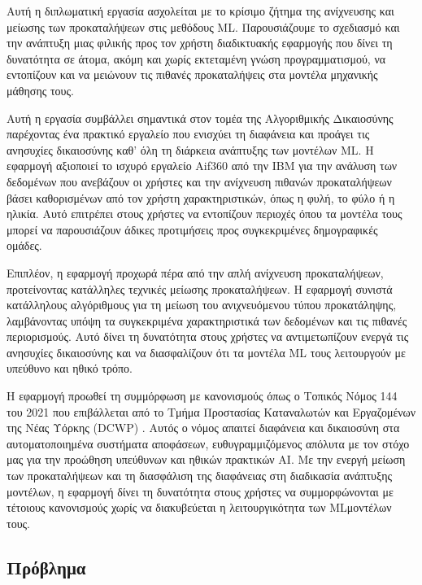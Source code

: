 \documentclass[12pt,twoside]{article}
\newcommand{\en}{\selectlanguage{english}}
\newcommand{\gr}{\selectlanguage{greek}}
\begin{document}
Αυτή η διπλωματική εργασία ασχολείται με το κρίσιμο ζήτημα της ανίχνευσης και μείωσης των προκαταλήψεων στις μεθόδους ML. Παρουσιάζουμε το σχεδιασμό και την ανάπτυξη μιας φιλικής προς τον χρήστη διαδικτυακής εφαρμογής που δίνει τη δυνατότητα σε άτομα, ακόμη και χωρίς εκτεταμένη γνώση προγραμματισμού, να εντοπίζουν και να μειώνουν τις πιθανές προκαταλήψεις στα μοντέλα μηχανικής μάθησης τους.

Αυτή η εργασία συμβάλλει σημαντικά στον τομέα της Αλγοριθμικής Δικαιοσύνης παρέχοντας ένα πρακτικό εργαλείο που ενισχύει τη διαφάνεια και προάγει τις ανησυχίες δικαιοσύνης καθ' όλη τη διάρκεια ανάπτυξης των μοντέλων ML. Η εφαρμογή αξιοποιεί το ισχυρό εργαλείο Aif360 από την IBM \cite{IBM2023} για την ανάλυση των δεδομένων που ανεβάζουν οι χρήστες και την ανίχνευση πιθανών προκαταλήψεων βάσει καθορισμένων από τον χρήστη χαρακτηριστικών, όπως η φυλή, το φύλο ή η ηλικία. Αυτό επιτρέπει στους χρήστες να εντοπίζουν περιοχές όπου τα μοντέλα τους μπορεί να παρουσιάζουν άδικες προτιμήσεις προς συγκεκριμένες δημογραφικές ομάδες.

Επιπλέον, η εφαρμογή προχωρά πέρα από την απλή ανίχνευση προκαταλήψεων, προτείνοντας κατάλληλες τεχνικές μείωσης προκαταλήψεων. Η εφαρμογή συνιστά κατάλληλους αλγόριθμους για τη μείωση του ανιχνευόμενου τύπου προκατάληψης, λαμβάνοντας υπόψη τα συγκεκριμένα χαρακτηριστικά των δεδομένων και τις πιθανές περιορισμούς. Αυτό δίνει τη δυνατότητα στους χρήστες να αντιμετωπίζουν ενεργά τις ανησυχίες δικαιοσύνης και να διασφαλίζουν ότι τα μοντέλα ML τους λειτουργούν με υπεύθυνο και ηθικό τρόπο.

Η εφαρμογή προωθεί τη συμμόρφωση με κανονισμούς όπως ο Τοπικός Νόμος 144 του 2021 που επιβάλλεται από το Τμήμα Προστασίας Καταναλωτών και Εργαζομένων της Νέας Υόρκης (DCWP) \cite{DCWP2021}. Αυτός ο νόμος απαιτεί διαφάνεια και δικαιοσύνη στα αυτοματοποιημένα συστήματα αποφάσεων, ευθυγραμμιζόμενος απόλυτα με τον στόχο μας για την προώθηση υπεύθυνων και ηθικών πρακτικών AI. Με την ενεργή μείωση των προκαταλήψεων και τη διασφάλιση της διαφάνειας στη διαδικασία ανάπτυξης μοντέλων, η εφαρμογή δίνει τη δυνατότητα στους χρήστες να συμμορφώνονται με τέτοιους κανονισμούς χωρίς να διακυβεύεται η λειτουργικότητα των \en ML\gr μοντέλων  τους.

\subsection{\gr Πρόβλημα}
\end{document}
